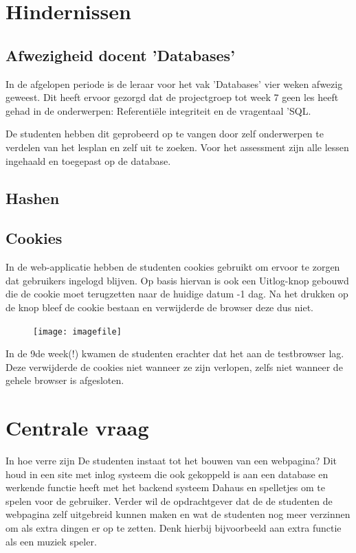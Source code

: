 \documentclass[11pt]{article}
\begin{document}
	\section{Hindernissen}
	
	\subsection{Afwezigheid docent 'Databases'}
	In de afgelopen periode is de leraar voor het vak 'Databases' vier weken afwezig geweest. Dit heeft ervoor gezorgd dat de projectgroep tot week 7 geen les heeft gehad in de onderwerpen: Referentiële integriteit en de vragentaal 'SQL.
	
	De studenten hebben dit geprobeerd op te vangen door zelf onderwerpen te verdelen van het lesplan en zelf uit te zoeken. Voor het assessment zijn alle lessen ingehaald en toegepast op de database. 
	
	
	\subsection{Hashen}
	
	
	
	
	\subsection{Cookies}
	In de web-applicatie hebben de studenten cookies gebruikt om ervoor te zorgen dat gebruikers ingelogd blijven. Op basis hiervan is ook een Uitlog-knop gebouwd die de cookie moet terugzetten naar de huidige datum -1 dag. Na het drukken op de knop bleef de cookie bestaan en verwijderde de browser deze dus niet. 
	\begin{figure}
		\centering
		\texttt{[image: imagefile]}
	\end{figure}
	
	In de 9de week(!) kwamen de studenten erachter dat het aan de testbrowser lag. Deze verwijderde de cookies niet wanneer ze zijn verlopen, zelfs niet wanneer de gehele browser is afgesloten.
	\newpage
	
	\section{Centrale vraag}
	In hoe verre zijn De studenten instaat tot het bouwen van een webpagina? Dit houd in een site met inlog systeem die ook gekoppeld is aan een database en werkende functie heeft met het backend systeem Dahaus en spelletjes om te spelen voor de gebruiker. Verder wil de opdrachtgever dat de de studenten de webpagina zelf uitgebreid kunnen maken en wat de studenten nog meer verzinnen om als extra dingen er op te zetten. Denk hierbij bijvoorbeeld aan extra functie als een muziek speler. 
	
\end{document}
